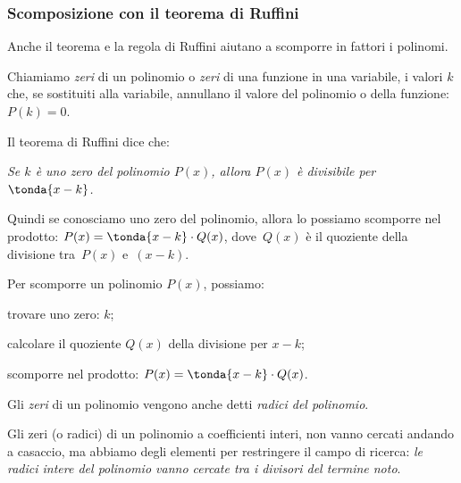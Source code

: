 
\subsubsection{Scomposizione con il teorema di Ruffini}
\label{subsubsec:divpol_scompruff}

Anche il teorema e la regola di Ruffini aiutano a scomporre in fattori i 
polinomi.

Chiamiamo \emph{zeri} di un 
polinomio o \emph{zeri} di una funzione in 
una variabile, i valori \(k\) che, se sostituiti alla variabile, annullano 
il valore del polinomio o della funzione: \(P(k) = 0\).

Il teorema di Ruffini dice che:

\begin{center}
\emph{Se \(k\) è uno zero del polinomio \(P(x)\), allora  
\(P(x)\) è divisibile per \(\tonda{x-k}\).}
\end{center}

Quindi se conosciamo uno zero del polinomio, allora lo possiamo 
scomporre nel prodotto: \(P(x) = \tonda{x-k} \cdot Q(x)\), 
dove~\(Q(x)\) è il quoziente della divisione tra~\(P(x)\) e~\((x-k)\).

\begin{procedura}{}{}
Per scomporre un polinomio \(P(x)\), possiamo:
\begin{enumeratea}
\item trovare uno zero: \(k\);
\item calcolare il quoziente \(Q(x)\) della divisione per \(x-k\);
\item scomporre nel prodotto: \(P(x) = \tonda{x-k} \cdot Q(x)\).
\end{enumeratea}
\end{procedura}

Gli \emph{zeri} di un polinomio vengono anche detti \emph{radici del 
polinomio}.

Gli zeri (o radici) di un polinomio a coefficienti interi, non vanno cercati 
andando a casaccio, ma abbiamo degli elementi per restringere il campo di 
ricerca: 
\emph{le radici intere del polinomio vanno cercate tra i divisori del 
termine noto}.

